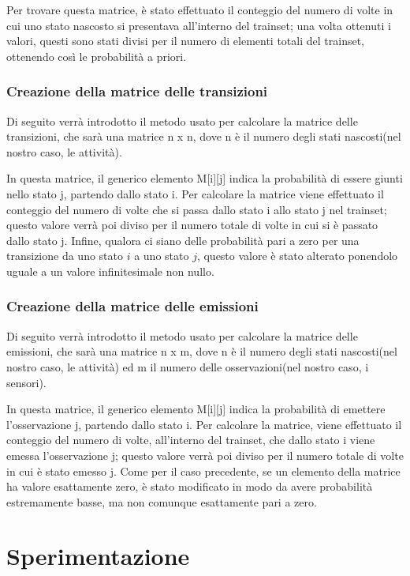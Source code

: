 \documentclass[10pt,a4paper]{article}
\begin{document}
	Per trovare questa matrice, è stato effettuato il conteggio del numero di volte in cui uno stato nascosto si presentava all'interno del trainset; una volta ottenuti i valori, questi sono stati divisi per il numero di elementi totali del trainset, ottenendo così le probabilità a priori.
	
	\subsubsection{Creazione della matrice delle transizioni}
	Di seguito verrà introdotto il metodo usato per calcolare la matrice delle transizioni, che sarà una matrice  n x n, dove n è il numero degli stati nascosti(nel nostro caso, le attività).
	
	In questa matrice, il generico elemento M[i][j] indica la probabilità di essere giunti nello stato j, partendo dallo stato i. Per calcolare la matrice viene effettuato il conteggio del numero di volte che si passa dallo stato i allo stato j nel trainset; questo valore verrà poi diviso per il numero totale di volte in cui si è passato dallo stato j. Infine, qualora ci siano delle probabilità pari a zero per una transizione da uno stato $i$ a uno stato $j$, questo valore è stato alterato ponendolo uguale a un valore infinitesimale non nullo.
	
	\subsubsection{Creazione della matrice delle emissioni}
	Di seguito verrà introdotto il metodo usato per calcolare la matrice delle emissioni, che sarà una matrice  n x m, dove n è il numero degli stati nascosti(nel nostro caso, le attività) ed m il numero delle osservazioni(nel nostro caso, i sensori).
	
	In questa matrice, il generico elemento M[i][j] indica la probabilità di emettere l'osservazione j, partendo dallo stato i. Per calcolare la matrice, viene effettuato il conteggio del numero di volte, all'interno del trainset, che dallo stato i viene emessa l'osservazione j; questo valore verrà poi diviso per il numero totale di volte in cui è stato emesso j. Come per il caso precedente, se un elemento della matrice ha valore esattamente zero, è stato modificato in modo da avere probabilità estremamente basse, ma non comunque esattamente pari a zero.
	
	\section{Sperimentazione}
	
\end{document}
